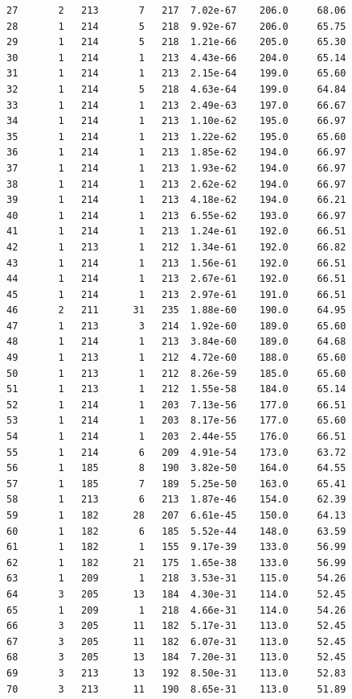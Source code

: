 \documentclass[
  letterpaper,
  DIV=11,
  numbers=noendperiod]{scrartcl}
\begin{document}
\begin{verbatim}
27       2   213       7   217  7.02e-67    206.0     68.06
28       1   214       5   218  9.92e-67    206.0     65.75
29       1   214       5   218  1.21e-66    205.0     65.30
30       1   214       1   213  4.43e-66    204.0     65.14
31       1   214       1   213  2.15e-64    199.0     65.60
32       1   214       5   218  4.63e-64    199.0     64.84
33       1   214       1   213  2.49e-63    197.0     66.67
34       1   214       1   213  1.10e-62    195.0     66.97
35       1   214       1   213  1.22e-62    195.0     65.60
36       1   214       1   213  1.85e-62    194.0     66.97
37       1   214       1   213  1.93e-62    194.0     66.97
38       1   214       1   213  2.62e-62    194.0     66.97
39       1   214       1   213  4.18e-62    194.0     66.21
40       1   214       1   213  6.55e-62    193.0     66.97
41       1   214       1   213  1.24e-61    192.0     66.51
42       1   213       1   212  1.34e-61    192.0     66.82
43       1   214       1   213  1.56e-61    192.0     66.51
44       1   214       1   213  2.67e-61    192.0     66.51
45       1   214       1   213  2.97e-61    191.0     66.51
46       2   211      31   235  1.88e-60    190.0     64.95
47       1   213       3   214  1.92e-60    189.0     65.60
48       1   214       1   213  3.84e-60    189.0     64.68
49       1   213       1   212  4.72e-60    188.0     65.60
50       1   213       1   212  8.26e-59    185.0     65.60
51       1   213       1   212  1.55e-58    184.0     65.14
52       1   214       1   203  7.13e-56    177.0     66.51
53       1   214       1   203  8.17e-56    177.0     65.60
54       1   214       1   203  2.44e-55    176.0     66.51
55       1   214       6   209  4.91e-54    173.0     63.72
56       1   185       8   190  3.82e-50    164.0     64.55
57       1   185       7   189  5.25e-50    163.0     65.41
58       1   213       6   213  1.87e-46    154.0     62.39
59       1   182      28   207  6.61e-45    150.0     64.13
60       1   182       6   185  5.52e-44    148.0     63.59
61       1   182       1   155  9.17e-39    133.0     56.99
62       1   182      21   175  1.65e-38    133.0     56.99
63       1   209       1   218  3.53e-31    115.0     54.26
64       3   205      13   184  4.30e-31    114.0     52.45
65       1   209       1   218  4.66e-31    114.0     54.26
66       3   205      11   182  5.17e-31    113.0     52.45
67       3   205      11   182  6.07e-31    113.0     52.45
68       3   205      13   184  7.20e-31    113.0     52.45
69       3   213      13   192  8.50e-31    113.0     52.83
70       3   213      11   190  8.65e-31    113.0     51.89

\end{verbatim}
\end{document}
